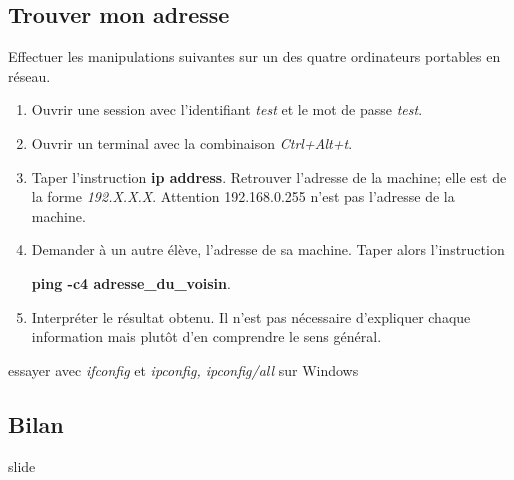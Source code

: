 \documentclass[a4paper,11pt]{article}
\begin{document}
\begin{Form}
\subsection{Trouver mon adresse}
Effectuer les manipulations suivantes sur un des quatre ordinateurs portables en réseau.
\begin{enumerate}
\item Ouvrir une session avec l'identifiant \emph{test} et le mot de passe \emph{test}.
\item Ouvrir un terminal avec la combinaison \emph{Ctrl+Alt+t}.
\item Taper l'instruction \textbf{ip address}. Retrouver l'adresse de la machine; elle est de la forme \emph{192.X.X.X}. Attention 192.168.0.255 n'est pas l'adresse de la machine.
\item Demander à un autre élève, l'adresse de sa machine. Taper alors l'instruction \begin{center}\textbf{ping -c4 adresse\_du\_voisin}.\end{center}
\item Interpréter le résultat obtenu. Il n'est pas nécessaire d'expliquer chaque information mais plutôt d'en comprendre le sens général.
\end{enumerate}
\begin{commentprof}
essayer avec \emph{ifconfig} et \emph{ipconfig, ipconfig/all} sur Windows
\end{commentprof}
\begin{commentprof}
\section*{Bilan}
slide
\end{commentprof}
\end{Form}
\end{document}
